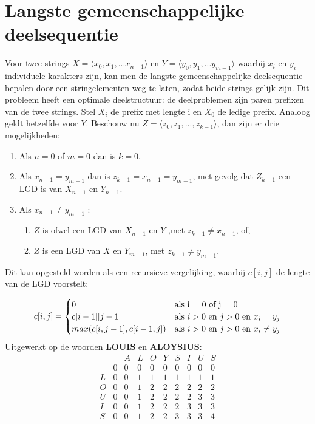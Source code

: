 \documentclass{report}
\begin{document}
	\section{Langste gemeenschappelijke deelsequentie}
 Voor twee strings $X = \langle x_0, x_1, ... x_{n - 1} \rangle$ en $Y = \langle y_0, y_1, ... y_{m - 1} \rangle$ waarbij $x_i$ en $y_i$ individuele karakters zijn, kan men de langste gemeenschappelijke deelsequentie bepalen door een stringelementen weg te laten, zodat beide strings gelijk zijn. Dit probleem heeft een optimale deelstructuur: de deelproblemen zijn paren prefixen van de twee strings. Stel $X_i$ de prefix met lengte i en $X_0$ de ledige prefix. Analoog geldt hetzelfde voor $Y$. Beschouw nu $Z = \langle z_0, z_1, ..., z_{k - 1} \rangle$, dan zijn er drie mogelijkheden:
 \begin{enumerate}
 	\item Als $n = 0$ of $m = 0$ dan is $k = 0$.
 	\item Als $x_{n - 1} = y_{m - 1}$ dan is $z_{k - 1} = x_{n - 1} = y_{m - 1}$, met gevolg dat $Z_{k - 1}$ een LGD is van $X_{n - 1}$ en $Y_{n - 1}$.
 	\item Als $x_{n - 1} \neq y_{m - 1}$ :
 	\begin{enumerate}
 		\item $Z$ is ofwel een LGD van $X_{n - 1}$ en $Y$ ,met $z_{k - 1} \neq x_{n - 1}$, of,
 		\item $Z$ is een LGD van $X$ en $Y_{m - 1}$, met $z_{k - 1} \neq y_{m - 1}$.
 	\end{enumerate}
  \end{enumerate}
 	Dit kan opgesteld worden als een recursieve vergelijking, waarbij $c[i, j]$ de lengte van de LGD voorstelt:
 	
 	$$c[i, j] = \begin{cases}
 	0 & \hbox{als i = 0 of j = 0}\\
 	c[i - 1][j - 1] & \hbox{als } i > 0 \hbox{ en } j > 0 \hbox{ en } x_i = y_j \\
 	max(c[i, j - 1], c[i - 1, j]) & \hbox{als } i > 0 \hbox{ en } j > 0 \hbox{ en } x_i \neq y_j
 	\end{cases}$$
 	Uitgewerkt op de woorden \textbf{LOUIS} en \textbf{ALOYSIUS}:
 	$$\begin{matrix} & & A & L & O & Y & S & I & U & S \\ & 0 & 0 & 0 & 0 & 0 & 0 & 0 & 0 & 0 \\ L & 0 & 0 & 1 & 1 & 1 & 1 & 1 & 1 & 1\\ O & 0 & 0 & 1 & 2 & 2 & 2 & 2 & 2 & 2\\ U & 0 & 0 & 1 & 2 & 2 & 2 & 2 & 3 & 3\\ I & 0 & 0 & 1 & 2 & 2 & 2 & 3 & 3 & 3\\ S & 0 & 0 & 1 & 2 & 2 & 3 & 3 & 3 & 4\\ \end{matrix}$$
\end{document}
